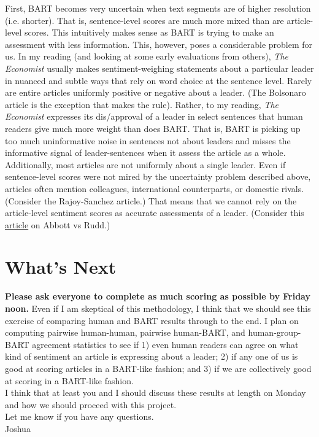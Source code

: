 \documentclass[11pt, letterpaper, twoside]{article}
\begin{document}
First, BART becomes very uncertain when text segments are of higher resolution (i.e. shorter). That is, sentence-level scores are much more mixed than are article-level scores. This intuitively makes sense as BART is trying to make an assessment with less information. This, however, poses a considerable problem for us. In my reading (and looking at some early evaluations from others), \textit{The Economist} usually makes sentiment-weighing statements about a particular leader in nuanced and subtle ways that rely on word choice at the sentence level. Rarely are entire articles uniformly positive or negative about a leader. (The Bolsonaro article is the exception that makes the rule). Rather, to my reading, \textit{The Economist} expresses its dis/approval of a leader in select sentences that human readers give much more weight than does BART. That is, BART is picking up too much uninformative noise in sentences not about leaders and misses the informative signal of leader-sentences when it assess the article as a whole.\\

Additionally, most articles are not uniformly about a single leader. Even if sentence-level scores were not mired by the uncertainty problem described above, articles often mention colleagues, international counterparts, or domestic rivals. (Consider the Rajoy-Sanchez article.) That means that we cannot rely on the article-level sentiment scores as accurate assessments of a leader. (Consider this  \href{https://www.proquest.com/abicomplete/docview/1429490805/fulltext/21043B32474D462DPQ/7?accountid=14657}{article} on Abbott vs Rudd.)

\section{What's Next}
\textbf{Please ask everyone to complete as much scoring as possible by Friday noon.} Even if I am skeptical of this methodology, I think that we should see this exercise of comparing human and BART results through to the end. I plan on computing pairwise human-human, pairwise human-BART, and human-group-BART agreement statistics to see if 1) even human readers can agree on what kind of sentiment an article is expressing about a leader; 2) if any one of us is good at scoring articles in a BART-like fashion; and 3) if we are collectively good at scoring in a BART-like fashion.\\

I think that at least you and I should discuss these results at length on Monday and how we should proceed with this project.\\


Let me know if you have any questions.\\
Joshua
\end{document}
